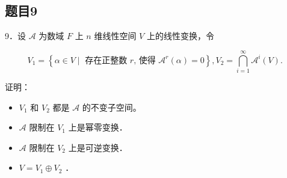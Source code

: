 \documentclass{article}
\begin{document}
\subsection{题目9}
9．设 \(\mathcal{A}\) 为数域 \(F\) 上 \(n\) 维线性空间 \(V\) 上的线性变换，令

\[
V_{1}=\left\{\alpha \in V \mid \text { 存在正整数 } r \text {, 使得 } \mathcal{A}^{r}(\alpha)=0\right\}, V_{2}=\bigcap_{i=1}^{\infty} \mathcal{A}^{i}(V) \text {. }
\]

证明：

\begin{itemize}
  \item[（1）] \(V_{1}\) 和 \(V_{2}\) 都是 \(\mathcal{A}\) 的不变子空间。
  \item[（2）] \(\mathcal{A}\) 限制在 \(V_{1}\) 上是幂零变换．
  \item[（3）] \(\mathcal{A}\) 限制在 \(V_{2}\) 上是可逆变换．
  \item[（4）] \(V=V_{1} \oplus V_{2}\) ．
\end{itemize}
\end{document}
